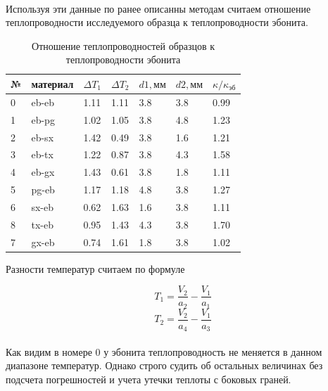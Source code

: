 \documentclass[a4paper, 12pt]{article}
\begin{document}
    \paragraph{}
    Используя эти данные по ранее описанны методам считаем отношение теплопроводности исследуемого образца к теплопроводности эбонита.

    \newpage

    \begin{table}[h]
        \begin{center}
            \begin{tabular}{|l|l|ll|ll|l|}
            \hline
            {№} & материал & $\Delta T_1$ & $\Delta T_2$ & $d1, мм$ &   $d2, мм$ & $\kappa / \kappa_{эб}$ \\
            \hline
            0 &    eb-eb &  1.11 &  1.11 &  3.8 &  3.8 &  0.99 \\\hline
            1 &    eb-pg &  1.02 &  1.05 &  3.8 &  4.8 &  1.23 \\
            2 &    eb-sx &  1.42 &  0.49 &  3.8 &  1.6 &  1.21 \\
            3 &    eb-tx &  1.22 &  0.87 &  3.8 &  4.3 &  1.58 \\
            4 &    eb-gx &  1.43 &  0.61 &  3.8 &  1.8 &  1.11 \\\hline
            5 &    pg-eb &  1.17 &  1.18 &  4.8 &  3.8 &  1.27 \\
            6 &    sx-eb &  0.62 &  1.63 &  1.6 &  3.8 &  1.11 \\
            8 &    tx-eb &  0.95 &  1.43 &  4.3 &  3.8 &  1.70 \\
            7 &    gx-eb &  0.74 &  1.61 &  1.8 &  3.8 &  1.02 \\
            \hline
            \end{tabular}
            \caption{Отношение теплопроводностей образцов к теплопроводности эбонита}
        \end{center}
    \end{table}

    Разности температур считаем по формуле

    \[T_1 = \frac{V_2}{a_2} - \frac{V_1}{a_1}\]
    \[T_2 = \frac{V_2}{a_4} - \frac{V_1}{a_3}\]

    \paragraph{}
    Как видим в номере 0 у эбонита теплопроводность не меняется в данном диапазоне температур. Однако строго судить об остальных величинах без подсчета погрешностей и учета утечки теплоты с боковых граней.
\end{document}
